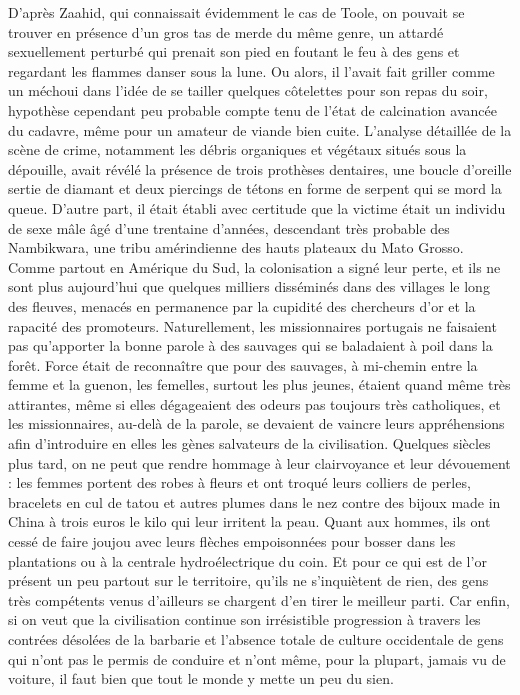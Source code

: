 %
D’après Zaahid, qui connaissait évidemment le cas de Toole, on pouvait se trouver en présence d’un gros tas de merde du même genre, un attardé sexuellement perturbé qui prenait son pied en foutant le feu à des gens et regardant les flammes danser sous la lune. Ou alors, il l’avait fait griller comme un méchoui dans l’idée de se tailler quelques côtelettes pour son repas du soir, hypothèse cependant peu probable compte tenu de l’état de calcination avancée du cadavre, même pour un amateur de viande bien cuite. L’analyse détaillée de la scène de crime, notamment les débris organiques et végétaux situés sous la dépouille, avait révélé la présence de trois prothèses dentaires, une boucle d’oreille sertie de diamant et deux piercings de tétons en forme de serpent qui se mord la queue. D’autre part, il était établi avec certitude que la victime était un individu de sexe mâle âgé d’une trentaine d’années, descendant très probable des Nambikwara, une tribu amérindienne des hauts plateaux du Mato Grosso. Comme partout en Amérique du Sud, la colonisation a signé leur perte, et ils ne sont plus aujourd’hui que quelques milliers disséminés dans des villages le long des fleuves, menacés en permanence par la cupidité des chercheurs d’or et la rapacité des promoteurs. Naturellement, les missionnaires portugais ne faisaient pas qu’apporter la bonne parole à des sauvages qui se baladaient à poil dans la forêt. Force était de reconnaître que pour des sauvages, à mi-chemin entre la femme et la guenon, les femelles, surtout les plus jeunes, étaient quand même très attirantes, même si elles dégageaient des odeurs pas toujours très catholiques, et les missionnaires, au-delà de la parole, se devaient de vaincre leurs appréhensions afin d’introduire en elles les gènes salvateurs de la civilisation. Quelques siècles plus tard, on ne peut que rendre hommage à leur clairvoyance et leur dévouement : les femmes portent des robes à fleurs et ont troqué leurs colliers de perles, bracelets en cul de tatou et autres plumes dans le nez contre des bijoux made in China à trois euros le kilo qui leur irritent la peau. Quant aux hommes, ils ont cessé de faire joujou avec leurs flèches empoisonnées pour bosser dans les plantations ou à la centrale hydroélectrique du coin. Et pour ce qui est de l’or présent un peu partout sur le territoire, qu’ils ne s’inquiètent de rien, des gens très compétents venus d’ailleurs se chargent d’en tirer le meilleur parti. Car enfin, si on veut que la civilisation continue son irrésistible progression à travers les contrées désolées de la barbarie et l’absence totale de culture occidentale de gens qui n’ont pas le permis de conduire et n’ont même, pour la plupart, jamais vu de voiture, il faut bien que tout le monde y mette un peu du sien.

